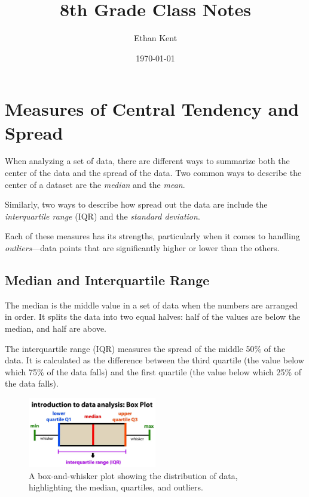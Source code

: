 \documentclass[12pt]{article}
\title{8th Grade Class Notes}
\author{Ethan Kent}
\date{\today}
\begin{document}
\maketitle

\tableofcontents

\section{Measures of Central Tendency and Spread}

When analyzing a set of data, there are different ways to summarize both the
center of the data and the spread of the data. Two common ways to describe the
center of a dataset are the \emph{median} and the \emph{mean}.

Similarly, two ways to describe how spread out the data are include the
\emph{interquartile range} (IQR) and the \emph{standard deviation}.

Each of these measures has its strengths, particularly when it comes to handling
\emph{outliers}---data points that are significantly higher or lower than the
others.

\subsection{Median and Interquartile Range}

The median is the middle value in a set of data when the numbers are arranged in
order. It splits the data into two equal halves: half of the values are below
the median, and half are above.

The interquartile range (IQR) measures the spread of the middle 50\% of the
data. It is calculated as the difference between the third quartile (the value
below which 75\% of the data falls) and the first quartile (the value below
which 25\% of the data falls).

\begin{figure}[ht]
  \centering
  \includegraphics[width=0.5\textwidth]{box-whisker-plot}
  \caption{A box-and-whisker plot showing the distribution of data, highlighting the median, quartiles, and outliers.}
  \label{fig:box-whisker}
\end{figure}
\end{document}
